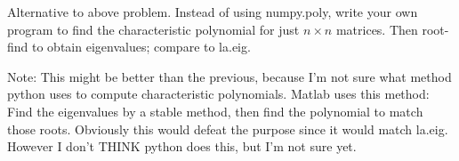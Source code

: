 \begin{problem}
Alternative to above problem. Instead of using numpy.poly, write your own program to find the characteristic polynomial for just $n \times n$ matrices. Then root-find to obtain eigenvalues; compare to la.eig.

Note:
This might be better than the previous, because I'm not sure what method python uses to compute characteristic polynomials. Matlab uses this method: Find the eigenvalues by a stable method, then find the polynomial to match those roots. Obviously this would defeat the purpose since it would match la.eig. However I don't THINK python does this, but I'm not sure yet.
\end{problem}




